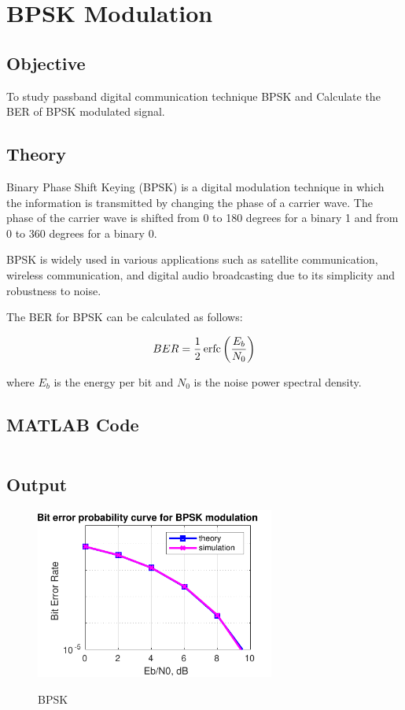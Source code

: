 \section{BPSK Modulation}
\label{sec:bpsk}

\subsection{Objective}
To study passband digital communication technique BPSK and
Calculate the BER of BPSK modulated signal.

\subsection{Theory}
Binary Phase Shift Keying (BPSK) is a digital modulation technique
in which the information is transmitted by changing the phase of a
carrier wave. The phase of the carrier wave is shifted
from 0 to 180 degrees for a binary 1 and from 0 to 360 degrees
for a binary 0.

BPSK is widely used in various applications such as satellite communication,
wireless communication, and digital audio broadcasting due
to its simplicity and robustness to noise.

The BER for BPSK can be calculated as follows:

\begin{equation}
    \label{eq:bpsk}
    BER = \frac{1}{2}\, \textnormal{erfc}\left( \frac{E_b}{N_0} \right)
\end{equation}

where $E_b$ is the energy per bit and $N_0$ is the noise power spectral density.

\subsection{MATLAB Code}

\inputminted[fontsize=\footnotesize,autogobble]{matlab}{code/bpsk.m}

\pagebreak
\subsection{Output}

\begin{figure}[!htb]
    \centering
    \includegraphics[width=0.7\textwidth]{res/figures/BPSK.pdf}
    \label{output:bpsk}
    \caption{BPSK}
\end{figure}

